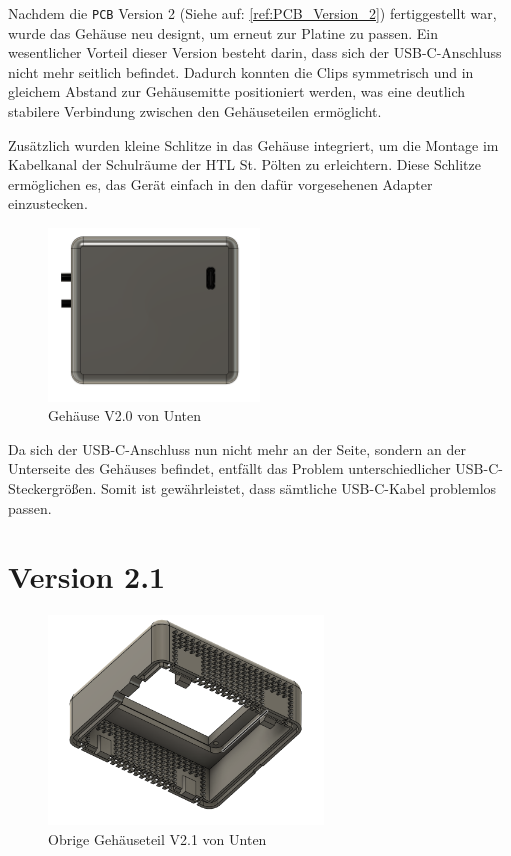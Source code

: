 \begin{inhalt}
Nachdem die \texttt{PCB} Version 2 (Siehe auf: \ref{ref:PCB_Version_2}) fertiggestellt war, wurde das Gehäuse neu designt, um erneut zur Platine zu passen.  
Ein wesentlicher Vorteil dieser Version besteht darin, dass sich der USB-C-Anschluss nicht mehr seitlich befindet.  
Dadurch konnten die Clips symmetrisch und in gleichem Abstand zur Gehäusemitte positioniert werden, was eine deutlich stabilere Verbindung zwischen den Gehäuseteilen ermöglicht.
 

\vspace{0.15cm}

Zusätzlich wurden kleine Schlitze in das Gehäuse integriert, um die Montage im Kabelkanal der Schulräume der HTL St. Pölten zu erleichtern.  
Diese Schlitze ermöglichen es, das Gerät einfach in den dafür vorgesehenen Adapter einzustecken.


\begin{figure}[!htb]
\centering
\includegraphics[width=0.5\textwidth]{files/Thomas/pics/geheause/2.0/gehaeuse_bot.png}
\caption[Gehäuse V2.0 von Unten]{Gehäuse V2.0 von Unten}
\label{fig:gehaeuse_internet_bild}
\end{figure}

Da sich der USB-C-Anschluss nun nicht mehr an der Seite, sondern an der Unterseite des Gehäuses befindet, entfällt das Problem unterschiedlicher USB-C-Steckergrößen.  
Somit ist gewährleistet, dass sämtliche USB-C-Kabel problemlos passen.


\section{Version 2.1}

\begin{figure}[!htb]
\centering
\includegraphics[width=0.65\textwidth]{files/Thomas/pics/geheause/2.1/gehaeuse_side.png}
\caption[Obrige Gehäuseteil V2.1 von Unten]{Obrige Gehäuseteil V2.1 von Unten}
\label{fig:gehaeuse_internet_bild}
\end{figure}




\end{inhalt}
